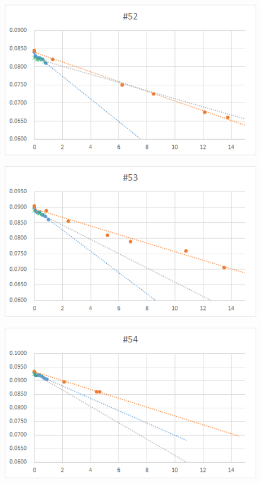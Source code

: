   \begin{figure}[htbp]
    \centering
       \includegraphics[width=120mm]{vol_052.png}
  \end{figure}
  \begin{figure}[htbp]
    \centering
       \includegraphics[width=120mm]{vol_053.png}
  \end{figure}
  \begin{figure}[htbp]
    \centering
       \includegraphics[width=120mm]{vol_054.png}
  \end{figure}
